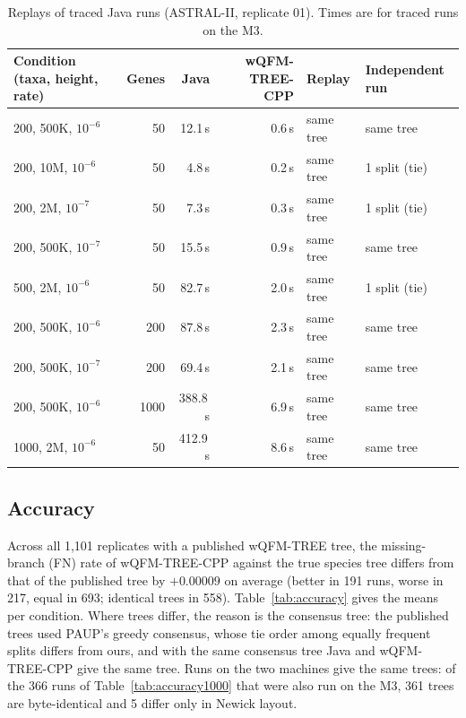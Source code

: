 \documentclass[11pt,a4paper]{article}
\newcommand{\wqfmtree}{wQFM-TREE}
\newcommand{\cpp}{wQFM-TREE-CPP}
\begin{document}
\begin{table}[t]
\centering\small
\caption{Replays of traced Java runs (ASTRAL-II, replicate 01). Times are for traced runs on the M3.}
\label{tab:replay}
\setlength{\tabcolsep}{5pt}
\begin{tabular}{lrrrll}
\toprule
Condition (taxa, height, rate) & Genes & Java & \cpp & Replay & Independent run \\
\midrule
200, 500K, $10^{-6}$ & 50   & 12.1\,s  & 0.6\,s & same tree & same tree \\
200, 10M, $10^{-6}$  & 50   & 4.8\,s   & 0.2\,s & same tree & 1 split (tie) \\
200, 2M, $10^{-7}$   & 50   & 7.3\,s   & 0.3\,s & same tree & 1 split (tie) \\
200, 500K, $10^{-7}$ & 50   & 15.5\,s  & 0.9\,s & same tree & same tree \\
500, 2M, $10^{-6}$   & 50   & 82.7\,s  & 2.0\,s & same tree & 1 split (tie) \\
200, 500K, $10^{-6}$ & 200  & 87.8\,s  & 2.3\,s & same tree & same tree \\
200, 500K, $10^{-7}$ & 200  & 69.4\,s  & 2.1\,s & same tree & same tree \\
200, 500K, $10^{-6}$ & 1000 & 388.8\,s & 6.9\,s & same tree & same tree \\
1000, 2M, $10^{-6}$  & 50   & 412.9\,s & 8.6\,s & same tree & same tree \\
\bottomrule
\end{tabular}
\end{table}

\subsection{Accuracy}

Across all 1{,}101 replicates with a published \wqfmtree{} tree, the missing-branch (FN) rate of
\cpp{} against the true species tree differs from that of the published tree by $+0.00009$ on
average (better in 191 runs, worse in 217, equal in 693; identical trees in 558).
Table~\ref{tab:accuracy} gives the means per condition. Where trees differ, the reason is the
consensus tree: the published trees used PAUP's greedy consensus, whose tie order among equally
frequent splits differs from ours, and with the same consensus tree Java and \cpp{} give the same
tree. Runs on the two machines give the same trees: of the 366 runs of Table~\ref{tab:accuracy1000}
that were also run on the M3, 361 trees are byte-identical and 5 differ only in Newick layout.
\end{document}
